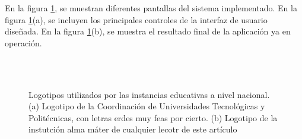 \documentclass[conference]{IEEEtran}
\begin{document}
En la figura \ref{fig:figura3}, se muestran diferentes pantallas del sistema implementado. En la figura \ref{fig:figura3}(a), se incluyen los principales controles de la interfaz de usuario diseñada. En la figura \ref{fig:figura3}(b), se muestra el resultado final de la aplicación ya en operación. 


%
%
% 
\begin{figure}
\\
\\
\caption{Logotipos utilizados por las instancias educativas a nivel nacional. (a) Logotipo de la Coordinación de Universidades Tecnológicas y Politécnicas, con letras erdes muy feas por cierto. (b) Logotipo de la instutción alma máter de cualquier lecotr de este artículo}
\label{fig:figura3}
\end{figure}
\end{document}
